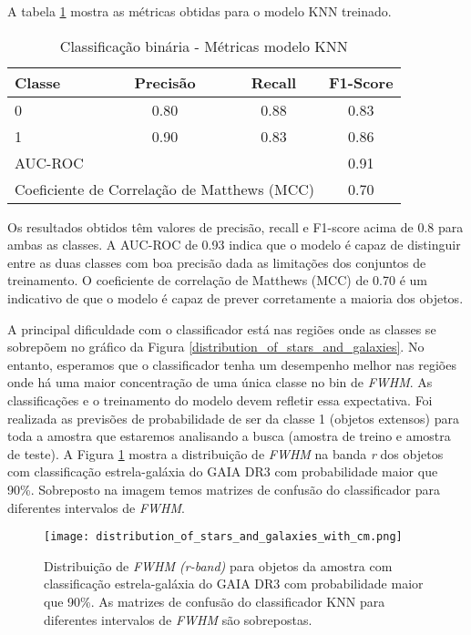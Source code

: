A tabela \ref{metricas_modelo} mostra as métricas obtidas para o modelo KNN treinado.

\begin{table}[!ht]
    \centering
    \caption{Classificação binária - Métricas modelo KNN}
    \begin{tabular}{lccc}
        \toprule
        Classe & Precisão & Recall & F1-Score \\
        \midrule
        0 & 0.80 & 0.88 & 0.83 \\
        1 & 0.90 & 0.83 & 0.86 \\
        \midrule
        \multicolumn{3}{l}{AUC-ROC} & 0.91 \\
        \multicolumn{3}{l}{Coeficiente de Correlação de Matthews (MCC)} & 0.70 \\
        \bottomrule
    \end{tabular}
    \label{metricas_modelo}
\end{table}

Os resultados obtidos têm valores de precisão, recall e F1-score acima de 0.8 para ambas as classes. A AUC-ROC de 0.93 indica que o modelo é capaz de distinguir entre as duas classes com boa precisão dada as limitações dos conjuntos de treinamento. O coeficiente de correlação de Matthews (MCC) de 0.70 é um indicativo de que o modelo é capaz de prever corretamente a maioria dos objetos.

\vspace{\baselineskip}

A principal dificuldade com o classificador está nas regiões onde as classes se sobrepõem no gráfico da Figura \ref{distribution_of_stars_and_galaxies}. No entanto, esperamos que o classificador tenha um desempenho melhor nas regiões onde há uma maior concentração de uma única classe no bin de \textit{FWHM}. As classificações e o treinamento do modelo devem refletir essa expectativa.
Foi realizada as previsões de probabilidade de ser da classe 1 (objetos extensos) para toda a amostra que estaremos analisando a busca (amostra de treino e amostra de teste). 
A Figura \ref{probabilidade_extensos_fwhm} mostra a distribuição de \textit{FWHM} na banda \textit{r} dos objetos com classificação estrela-galáxia do GAIA DR3 com probabilidade maior que 90\%. Sobreposto na imagem temos matrizes de confusão do classificador para diferentes intervalos de \textit{FWHM}.

\begin{figure}[!ht]
    \centering
    \texttt{[image: distribution\_of\_stars\_and\_galaxies\_with\_cm.png]}
    \caption[]{Distribuição de \textit{FWHM (r-band)} para objetos da amostra com classificação estrela-galáxia do GAIA DR3 com probabilidade maior que 90\%. As matrizes de confusão do classificador KNN para diferentes intervalos de \textit{FWHM} são sobrepostas.}
    \label{probabilidade_extensos_fwhm}
\end{figure}

